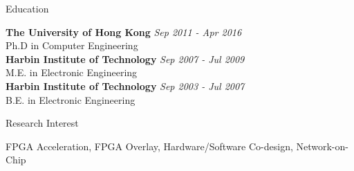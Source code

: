 \documentclass{resume} %
\begin{document}
\begin{rSection}{Education}

{\bf The University of Hong Kong} \hfill {\em Sep 2011 - Apr 2016} \\ 
Ph.D in Computer Engineering \\
{\bf Harbin Institute of Technology} \hfill {\em Sep 2007 - Jul 2009} \\
M.E. in Electronic Engineering \\
{\bf Harbin Institute of Technology} \hfill {\em Sep 2003 - Jul 2007} \\
B.E. in Electronic Engineering \\

\end{rSection}

\begin{rSection}{Research Interest}
    \vspace{-1em}
\item FPGA Acceleration, FPGA Overlay, Hardware/Software Co-design, Network-on-Chip
    \vspace{-0.5em}
\end{rSection}
\end{document}
